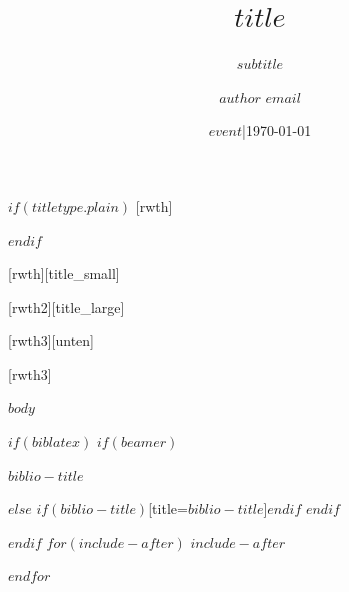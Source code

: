 \documentclass[t]{beamer}
\title{$title$}
\subtitle{$subtitle$}
\date[RWTH]{$event$\enskip|\enskip\today}
\author[Max]{$author$ $email$}
\institute[RWTH]{RWTH Aachen University}
\begin{document}
$if(titletype.plain)$
[rwth]{}
\begin{frame}[plain]
\titlepage
\end{frame}
$endif$

[rwth][title_small]{}
\begin{frame}[plain]
\titlepage
\end{frame}

[rwth2][title_large]{}
\begin{frame}[plain]
\titlepage
\end{frame}

[rwth3][unten]{}
\begin{frame}[plain]
\titlepage
\end{frame}

[rwth3]{}
\begin{frame}[plain]
\titlepage
\end{frame}



$body$

$if(biblatex)$
$if(beamer)$
\begin{frame}[allowframebreaks]{$biblio-title$}
  \bibliographytrue
  \printbibliography[heading=none]
\end{frame}
$else$
\printbibliography$if(biblio-title)$[title=$biblio-title$]$endif$
$endif$

$endif$
$for(include-after)$
$include-after$

$endfor$
\end{document}
